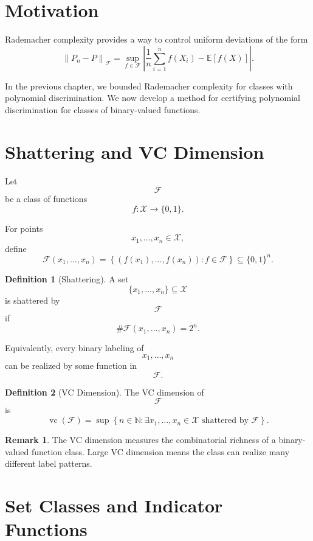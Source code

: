 \documentclass[12pt,oneside]{book}
\numberwithin{equation}{section}
\theoremstyle{definition}
\newtheorem{definition}{Definition}[section]
\newtheorem{remark}{Remark}[section]
\theoremstyle{plain}
\theoremstyle{remark}
\newcommand{\N}{\mathbb{N}}
\newcommand{\E}{\mathbb{E}}
\newcommand{\norm}[1]{\left\lVert #1 \right\rVert}
\begin{document}
\section{Motivation}

Rademacher complexity provides a way to control uniform deviations of the form
\[
\norm{P_n-P}_{\mathcal{F}}
=
\sup_{f\in\mathcal{F}}
\left|
\frac{1}{n}\sum_{i=1}^n f(X_i)-\E[f(X)]
\right|.
\]

In the previous chapter, we bounded Rademacher complexity for classes with polynomial discrimination. We now develop a method for certifying polynomial discrimination for classes of binary-valued functions.

\section{Shattering and VC Dimension}

Let
\[
\mathcal{F}
\]
be a class of functions
\[
f:\mathcal{X}\to\{0,1\}.
\]

For points
\[
x_1,\dots,x_n\in\mathcal{X},
\]
define
\[
\mathcal{F}(x_1,\dots,x_n)
=
\left\{
(f(x_1),\dots,f(x_n)):f\in\mathcal{F}
\right\}
\subseteq \{0,1\}^n.
\]

\begin{definition}[Shattering]
A set
\[
\{x_1,\dots,x_n\}\subseteq\mathcal{X}
\]
is shattered by
\[
\mathcal{F}
\]
if
\[
\#\mathcal{F}(x_1,\dots,x_n)=2^n.
\]

Equivalently, every binary labeling of
\[
x_1,\dots,x_n
\]
can be realized by some function in
\[
\mathcal{F}.
\]
\end{definition}

\begin{definition}[VC Dimension]
The VC dimension of
\[
\mathcal{F}
\]
is
\[
\operatorname{vc}(\mathcal{F})
=
\sup\left\{
n\in\N:
\exists x_1,\dots,x_n\in\mathcal{X}
\text{ shattered by }\mathcal{F}
\right\}.
\]
\end{definition}

\begin{remark}
The VC dimension measures the combinatorial richness of a binary-valued function class. Large VC dimension means the class can realize many different label patterns.
\end{remark}

\section{Set Classes and Indicator Functions}
\end{document}
